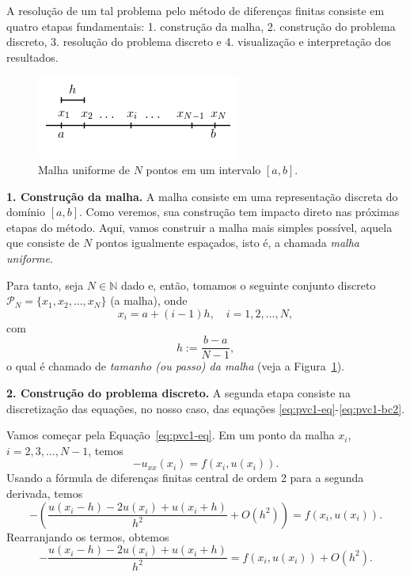 A resolução de um tal problema pelo método de diferenças finitas consiste em quatro etapas fundamentais: 1. construção da malha, 2. construção do problema discreto, 3. resolução do problema discreto e 4. visualização e interpretação dos resultados. 

\begin{figure}
  \centering
  \includegraphics{./cap_pvc/pics/malha_uniforme/malha_uniforme}
  \caption{Malha uniforme de $N$ pontos em um intervalo $[a, b]$.}
  \label{fig:malha_uniforme}
\end{figure}

{\bf 1. Construção da malha.} A malha consiste em uma representação discreta do domínio $[a, b]$. Como veremos, sua construção tem impacto direto nas próximas etapas do método. Aqui, vamos construir a malha mais simples possível, aquela que consiste de $N$ pontos igualmente espaçados, isto é, a chamada \emph{malha uniforme}.

Para tanto, seja $N\in\mathbb{N}$ dado e, então, tomamos o seguinte conjunto discreto $\mathcal{P}_N = \{x_1, x_2, \dotsc, x_N\}$ (a malha), onde
\begin{equation}
  x_i = a + (i-1)h,\quad i=1, 2, \dotsc, N,
\end{equation}
com
\begin{equation}
  h:=\frac{b-a}{N-1},
\end{equation}
o qual é chamado de \emph{tamanho (ou passo) da malha} (veja a Figura~\ref{fig:malha_uniforme}).

{\bf 2. Construção do problema discreto.} A segunda etapa consiste na discretização das equações, no nosso caso, das equações \eqref{eq:pvc1-eq}-\eqref{eq:pvc1-bc2}. 

Vamos começar pela Equação~\eqref{eq:pvc1-eq}. Em um ponto da malha $x_i$, $i = 2, 3, \dotsc, N-1$, temos
\begin{equation}
  -u_{xx}(x_i) = f(x_i, u(x_i)).
\end{equation}
Usando a fórmula de diferenças finitas central de ordem 2 para a segunda derivada, temos
\begin{equation}
  -\left(\frac{u(x_i-h) - 2u(x_i) + u(x_i+h)}{h^2} + O(h^2)\right) = f(x_i, u(x_i)).
\end{equation}
Rearranjando os termos, obtemos
\begin{equation}
  -\frac{u(x_i-h) - 2u(x_i) + u(x_i+h)}{h^2} = f(x_i, u(x_i)) + O(h^2). 
\end{equation}

